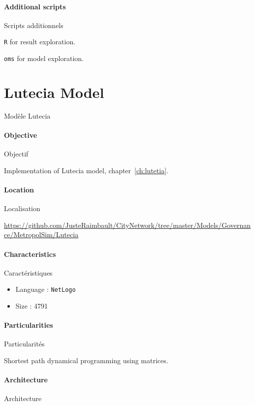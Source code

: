 \paragraph{Additional scripts}{Scripts additionnels}

\texttt{R} for result exploration.

\texttt{oms} for model exploration.







\section{Lutecia Model}{Modèle Lutecia}

\paragraph{Objective}{Objectif}

Implementation of Lutecia model, chapter~\ref{ch:lutetia}.

\paragraph{Location}{Localisation}

\url{https://github.com/JusteRaimbault/CityNetwork/tree/master/Models/Governance/MetropolSim/Lutecia}

\paragraph{Characteristics}{Caractéristiques}

\begin{itemize}
\item Language : \texttt{NetLogo}
\item Size : 4791
\end{itemize}


\paragraph{Particularities}{Particularités}

Shortest path dynamical programming using matrices.

\paragraph{Architecture}{Architecture}

